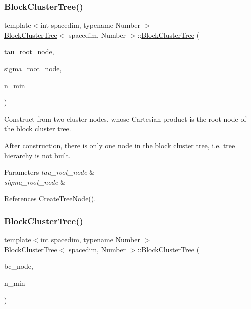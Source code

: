 \subsubsection{\texorpdfstring{Block\+Cluster\+Tree()}{BlockClusterTree()}\hspace{0.1cm}{\footnotesize\ttfamily [3/8]}}
{\footnotesize\ttfamily template$<$int spacedim, typename Number $>$ \\
\hyperlink{classBlockClusterTree}{Block\+Cluster\+Tree}$<$ spacedim, Number $>$\+::\hyperlink{classBlockClusterTree}{Block\+Cluster\+Tree} (\begin{DoxyParamCaption}\item[{typename \hyperlink{classClusterTree}{Cluster\+Tree}$<$ spacedim, Number $>$\+::\hyperlink{classTreeNode}{node\+\_\+pointer\+\_\+type}}]{tau\+\_\+root\+\_\+node,  }\item[{typename \hyperlink{classClusterTree}{Cluster\+Tree}$<$ spacedim, Number $>$\+::\hyperlink{classTreeNode}{node\+\_\+pointer\+\_\+type}}]{sigma\+\_\+root\+\_\+node,  }\item[{const unsigned int}]{n\+\_\+min = {} }\end{DoxyParamCaption})}

Construct from two cluster nodes, whose Cartesian product is the root node of the block cluster tree.

After construction, there is only one node in the block cluster tree, i.\+e. tree hierarchy is not built.


\begin{DoxyParams}{Parameters}
{\em tau\+\_\+root\+\_\+node} & \\
\hline
{\em sigma\+\_\+root\+\_\+node} & \\
\hline
\end{DoxyParams}


References Create\+Tree\+Node().

\mbox{\label{classBlockClusterTree_ace6087e8fe7dc3d737ff6b4cd97070fc}} 
\subsubsection{\texorpdfstring{Block\+Cluster\+Tree()}{BlockClusterTree()}\hspace{0.1cm}{\footnotesize\ttfamily [4/8]}}
{\footnotesize\ttfamily template$<$int spacedim, typename Number $>$ \\
\hyperlink{classBlockClusterTree}{Block\+Cluster\+Tree}$<$ spacedim, Number $>$\+::\hyperlink{classBlockClusterTree}{Block\+Cluster\+Tree} (\begin{DoxyParamCaption}\item[{\hyperlink{classTreeNode}{node\+\_\+pointer\+\_\+type}}]{bc\+\_\+node,  }\item[{const unsigned int}]{n\+\_\+min }\end{DoxyParamCaption})}


